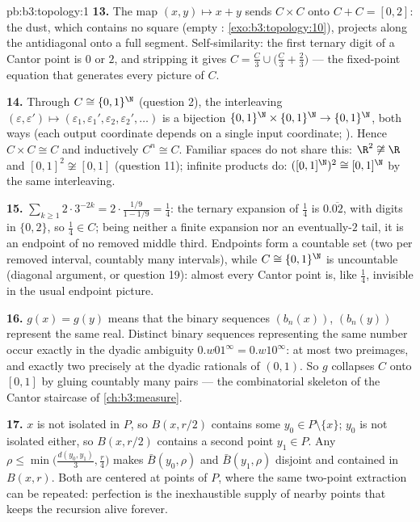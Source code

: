 \begin{solution}{pb:b3:topology:1}
\textbf{13.} The map $(x, y) \mapsto x + y$ sends $C \times C$
onto $C + C = [0,2]$: the dust, which contains no square
(empty : \cref{exo:b3:topology:10}), projects along
the antidiagonal onto a full segment. Self-similarity: the
first ternary digit of a Cantor point is $0$ or $2$, and
stripping it gives $C = \frac C3 \cup \bigl(\frac C3 +
\frac23\bigr)$ --- the fixed-point equation that generates
every picture of $C$.

\textbf{14.} Through $C \cong \{0,1\}^\N$ (question 2), the
interleaving $(\varepsilon, \varepsilon') \mapsto
(\varepsilon_1, \varepsilon_1', \varepsilon_2,
\varepsilon_2', \dots)$ is a bijection
$\{0,1\}^\N\times\{0,1\}^\N \to \{0,1\}^\N$,  both
ways (each output coordinate depends on a single input
coordinate; ). Hence $C\times C \cong C$ and
inductively $C^n \cong C$. Familiar spaces do not share this:
$\R^2 \not\cong \R$ and $[0,1]^2 \not\cong [0,1]$
(question 11); infinite products do: $([0,1]^\N)^2 \cong
[0,1]^\N$ by the same interleaving.

\textbf{15.} $\sum_{k\geq1}2\cdot3^{-2k} = 2\cdot\frac{1/9}{1
- 1/9} = \frac14$: the ternary expansion of $\frac14$ is
$0.\overline{02}$, with digits in $\{0,2\}$, so $\frac14 \in
C$; being neither a finite expansion nor an eventually-$2$
tail, it is an endpoint of no removed middle third. Endpoints
form a countable set (two per removed interval, countably many
intervals), while $C \cong \{0,1\}^\N$ is uncountable
(diagonal argument, or question 19): almost every Cantor
point is, like $\frac14$, invisible in the usual endpoint
picture.

\textbf{16.} $g(x) = g(y)$ means that the binary sequences
$(b_n(x))$, $(b_n(y))$ represent the same real. Distinct
binary sequences representing the same number occur exactly in
the dyadic ambiguity $0.w01^\infty = 0.w10^\infty$: at most
two preimages, and exactly two precisely at the dyadic
rationals of $(0,1)$. So $g$ collapses $C$ onto $[0,1]$ by
gluing countably many pairs --- the combinatorial skeleton of
the Cantor staircase of \cref{ch:b3:measure}.

\textbf{17.} $x$ is not isolated in $P$, so $B(x, r/2)$
contains some $y_0 \in P \setminus \{x\}$; $y_0$ is not
isolated either, so $B(x, r/2)$ contains a second point $y_1
\in P$. Any $\rho \leq \min\bigl(\frac{d(y_0,y_1)}3,
\frac r4\bigr)$ makes $\bar B(y_0, \rho)$ and $\bar B(y_1,
\rho)$ disjoint and contained in $B(x, r)$. Both are centered
at points of $P$, where the same two-point extraction can be
repeated: perfection is the inexhaustible supply of nearby
points that keeps the recursion alive forever.


\end{solution}
